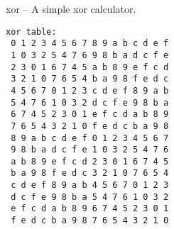 \begin{algorithm}{xor}
 -- A simple xor calculator.
\end{algorithm}

\begin{sourceslandscape}



\begin{verbatim}
xor table:
 0 1 2 3 4 5 6 7 8 9 a b c d e f
 1 0 3 2 5 4 7 6 9 8 b a d c f e
 2 3 0 1 6 7 4 5 a b 8 9 e f c d
 3 2 1 0 7 6 5 4 b a 9 8 f e d c
 4 5 6 7 0 1 2 3 c d e f 8 9 a b
 5 4 7 6 1 0 3 2 d c f e 9 8 b a
 6 7 4 5 2 3 0 1 e f c d a b 8 9
 7 6 5 4 3 2 1 0 f e d c b a 9 8
 8 9 a b c d e f 0 1 2 3 4 5 6 7
 9 8 b a d c f e 1 0 3 2 5 4 7 6
 a b 8 9 e f c d 2 3 0 1 6 7 4 5
 b a 9 8 f e d c 3 2 1 0 7 6 5 4
 c d e f 8 9 a b 4 5 6 7 0 1 2 3
 d c f e 9 8 b a 5 4 7 6 1 0 3 2
 e f c d a b 8 9 6 7 4 5 2 3 0 1
 f e d c b a 9 8 7 6 5 4 3 2 1 0
\end{verbatim}
\end{sourceslandscape}
